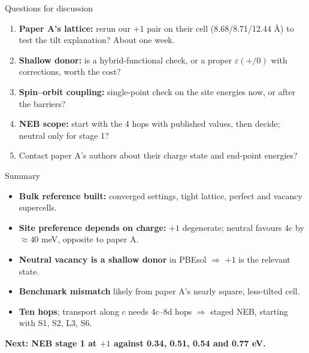 \documentclass[aspectratio=169,10pt]{beamer}
\begin{document}
\begin{frame}{Questions for discussion}
  \begin{enumerate}
    \item \textbf{Paper A's lattice:} rerun our $+1$ pair on their cell (8.68/8.71/12.44 \AA) to test the tilt explanation? About one week.
    \item \textbf{Shallow donor:} is a hybrid-functional check, or a proper $\varepsilon(+/0)$ with corrections, worth the cost?
    \item \textbf{Spin--orbit coupling:} single-point check on the site energies now, or after the barriers?
    \item \textbf{NEB scope:} start with the 4 hops with published values, then decide; neutral only for stage 1?
    \item Contact paper A's authors about their charge state and end-point energies?
  \end{enumerate}
\end{frame}

\begin{frame}{Summary}
  \begin{itemize}
    \item \textbf{Bulk reference built:} converged settings, tight lattice, perfect and vacancy supercells.
    \item \textbf{Site preference depends on charge:} $+1$ degenerate; neutral favours 4c by $\approx$40 meV, opposite to paper A.
    \item \textbf{Neutral vacancy is a shallow donor} in PBEsol $\Rightarrow$ $+1$ is the relevant state.
    \item \textbf{Benchmark mismatch} likely from paper A's nearly square, less-tilted cell.
    \item \textbf{Ten hops}; transport along $c$ needs 4c--8d hops $\Rightarrow$ staged NEB, starting with S1, S2, L3, S6.
  \end{itemize}

  \vspace{1em}
  \centering
  \textbf{Next: NEB stage 1 at $+1$ against 0.34, 0.51, 0.54 and 0.77 eV.}
\end{frame}
\end{document}
